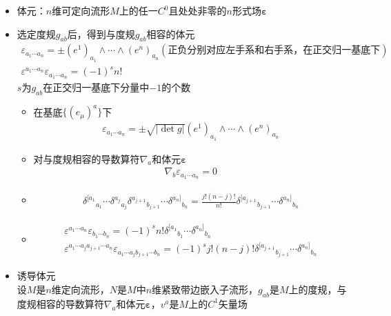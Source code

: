 \begin{itemize}
    \item 体元：$n$维可定向流形$M$上的任一$C^0$且处处非零的$n$形式场$\bm{\varepsilon}$
    \item 选定度规$g_{ab}$后，得到与度规$g_{ab}$相容的体元
    \begin{gather*}
        \varepsilon_{a_1 \cdots a_n}=\pm (e^1)_{a_1} \wedge \cdots \wedge (e^n)_{a_n} (\text{正负分别对应左手系和右手系，在正交归一基底下})
        \\
        \varepsilon^{a_1 \cdots a_n} \varepsilon_{a_1 \cdots a_n}=(-1)^s n!
    \end{gather*}
    $s$为$g_{ab}$在正交归一基底下分量中$-1$的个数
    \begin{itemize}
        \item 在基底$\{(e_{\mu})^a\}$下
        \begin{gather*}
            \varepsilon_{a_1 \cdots a_n}=\pm \sqrt{|\det g|} (e^1)_{a_1} \wedge \cdots \wedge (e^n)_{a_n}
        \end{gather*}
        \item 对与度规相容的导数算符$\nabla_a$和体元$\bm{\varepsilon}$
        \begin{gather*}
            \nabla_b \varepsilon_{a_1 \cdots a_n}=0
        \end{gather*}
        \item
        \begin{gather*}
            {\delta^{[a_1}}_{a_1} \cdots {\delta^{a_j}}_{a_j} {\delta^{a_{j+1}}}_{b_{j+1}} \cdots {\delta^{a_n]}}_{b_n}=\frac{j!(n-j)!}{n!}{\delta^{[a_{j+1}}}_{b_{j+1}} \cdots {\delta^{a_n]}}_{b_n}
        \end{gather*}
        \item 
        \begin{gather*}
            \varepsilon^{a_1 \cdots a_n} \varepsilon_{b_1 \cdots b_n}=(-1)^s n! {\delta^{[a_1}}_{b_1} \cdots {\delta^{a_n]}}_{b_n}
            \\
            \varepsilon^{a_1 \cdots a_j a_{j+1} \cdots a_n} \varepsilon_{a_1 \cdots a_j b_{j+1} \cdots b_n}=(-1)^s j! (n-j)! {\delta^{[a_{j+1}}}_{b_{j+1}} \cdots {\delta^{a_n]}}_{b_n}
        \end{gather*}
    \end{itemize}
    \item 诱导体元\\
    设$M$是$n$维定向流形，$N$是$M$中$n$维紧致带边嵌入子流形，$g_{ab}$是$M$上的度规，与度规相容的导数算符$\nabla_a$和体元$\bm{\varepsilon}$，$v^a$是$M$上的$C^1$矢量场\\

\end{itemize}
